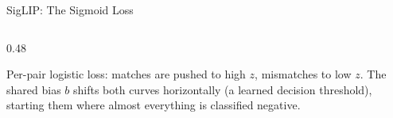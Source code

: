 \begin{frame}{SigLIP: The Sigmoid Loss}
\begin{columns}
\begin{column}{0.48\textwidth}
\begin{center}
      \end{center}
      {\scriptsize Per-pair logistic loss: matches are pushed to high $z$, mismatches to low $z$. The shared bias $b$ shifts both curves horizontally (a learned decision threshold), starting them where almost everything is classified negative.}
    \end{column}
  \end{columns}
\end{frame}

